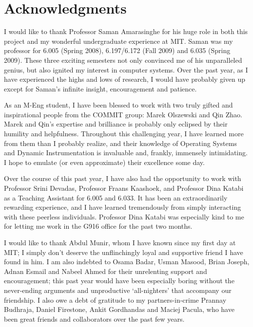 % 

\cleardoublepage

\section*{Acknowledgments}
I would like to thank Professor Saman Amarasinghe for his huge role in both this project 
and my wonderful undergraduate experience at MIT. 
Saman was my professor for 6.005 (Spring 2008), 6.197/6.172 (Fall 2009) and 6.035 (Spring 2009). These three exciting semesters 
not only convinced me of his unparalleled genius, but also ignited my interest in computer systems. 
Over the past year, as I have experienced the highs and lows of research, I would have probably given
up except for Saman's infinite insight, encouragement and patience. 
 
As an M-Eng student, I have been blessed to work with two truly gifted and inspirational people from the COMMIT group:
Marek Olszewski and Qin Zhao. Marek and Qin's expertise and brilliance is probably only eclipsed by their humility and 
helpfulness. Throughout this challenging year, I have learned more from them than I probably realize, 
and their knowledge of Operating Systems and Dynamic Instrumentation is invaluable and, frankly, immensely 
intimidating. I hope to emulate (or even approximate) their excellence some day.

Over the course of this past year, I have also had the opportunity to work with Professor Srini Devadas, 
Professor Fraans Kaashoek, and Professor Dina Katabi as a Teaching Assistant for 6.005 and 6.033. It has been an extraordinarily
rewarding experience, and I have learned tremendously from simply interacting with these peerless individuals. Professor
Dina Katabi was especially kind to me for letting me work in the G916 office for the past two months.

I would like to thank Abdul Munir, whom I have known since my first day at MIT; I simply don't deserve the unflinchingly loyal and supportive friend I have found in him. 
I am also indebted to Osama Badar, Usman Masood, Brian Joseph, Adnan Esmail and Nabeel Ahmed for their unrelenting support and encouragement;
this past year would have been especially boring without the never-ending arguments and unproductive `all-nighters' that accompany our friendship. 
I also owe a debt of gratitude to my partners-in-crime Prannay Budhraja, Daniel Firestone, Ankit Gordhandas and Maciej Pacula, 
who have been great friends and collaborators over the past few years. 
 
